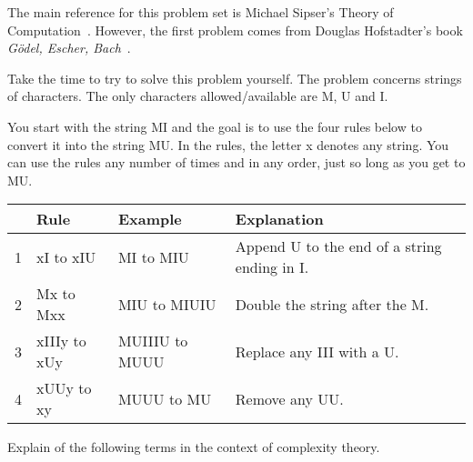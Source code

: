 \documentclass[a4paper, 12pt]{exam}
\begin{document}
\noindent
The main reference for this problem set is Michael Sipser's Theory of Computation~\cite{sipserbook}.
However, the first problem comes from Douglas Hofstadter's book \emph{Gödel, Escher, Bach}~\cite{hofstadter79}.

\begin{questions}


\question
  Take the time to try to solve this problem yourself.
  The problem concerns strings of characters.
  The only characters allowed/available are M, U and I.

  You start with the string MI and the goal is to use the four rules below to convert it into the string MU.
  In the rules, the letter x denotes any string.
  You can use the rules any number of times and in any order, just so long as you get to MU.

  \begin{center}
  \begin{tabular}{rlll}

  & Rule & Example & Explanation  \\
  \midrule
  1 &	xI to xIU & MI	to	MIU & Append U to the end of a string ending in I. \\
  2 &	Mx to Mxx & MIU	to	MIUIU & Double the string after the M. \\
  3 &	xIIIy to xUy & MUIIIU	to	MUUU & Replace any III with a U. \\
  4 &	xUUy to xy & MUUU	to	MU & Remove any UU. \\
  \bottomrule
  \end{tabular}
  \end{center}



\question
  Explain of the following terms in the context of complexity theory.
\end{questions}
\end{document}
